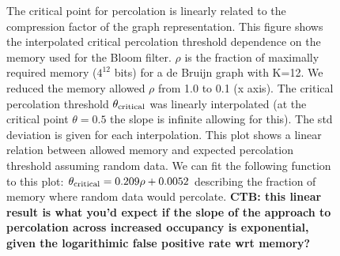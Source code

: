 \documentclass[12pt]{article} \usepackage{simplemargins}
\begin{document}
\begin{figure}
\caption{The critical point for percolation is linearly related to the
  compression factor of the graph representation.
This figure shows
  the interpolated critical percolation threshold dependence on the
  memory used for the Bloom filter. $\rho$ is the fraction of
  maximally required memory ($4^{12}$ bits) for a de Bruijn graph with
  K=12. We reduced the memory allowed $\rho$ from 1.0 to 0.1 (x
  axis). The critical percolation threshold $\theta_{\rm critical}$
  was linearly interpolated (at the critical point $\theta=0.5$ the
  slope is infinite allowing for this). The std deviation is given for
  each interpolation. This plot shows a linear relation between
  allowed memory and expected percolation threshold assuming random
  data. We can fit the following function to this plot: $\theta_{\rm
    critical} = 0.209 \rho + 0.0052$ describing the fraction of memory
  where random data would percolate.  {\bf CTB: this linear result is
    what you'd expect if the slope of the approach to percolation
    across increased occupancy is exponential, given the logarithimic
    false positive rate wrt memory?}}

\end{figure}


\end{document}
